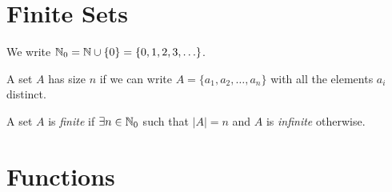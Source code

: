 \documentclass[../main.tex]{subfiles}
\begin{document}
\section{Finite Sets}
\label{finiteSets}
\begin{remark}[Notation]
We write $\mathbb{N}_0 = \mathbb{N} \cup \{0\} = \{0, 1, 2, 3, \ldots\}$.
\end{remark}
A set $A$ has size $n$ if we can write $A = \{a_1, a_2, \ldots, a_n\}$ with all the elements $a_i$ distinct.
\begin{definition}
  A set $A$ is \textit{finite} if $\exists n \in \mathbb{N}_0$ such that $|A| = n$ and $A$ is \textit{infinite} otherwise.
\end{definition}
\section{Functions}
\end{document}
